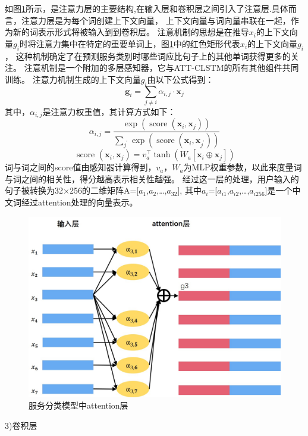   如图\ref{fig:att-cnn}所示，是注意力层的主要结构,在输入层和卷积层之间引入了注意层.具体而言，注意力层是为每个词创建上下文向量，
  上下文向量与词向量串联在一起，作为新的词表示形式将被输入到到卷积层。 
  注意机制的思想是在推导$x_{i}$的上下文向量$g_{i}$时将注意力集中在特定的重要单词上，图\ref{fig:att-cnn}中的红色矩形代表$x_{i}$的上下文向量$g_{i}$，
  这种机制确定了在预测服务类别时哪些词应比句子上的其他单词获得更多的关注。
  注意机制是一个附加的多层感知器，它与ATT-CLSTM的所有其他组件共同训练。
  注意力机制生成的上下文向量$g_{i}$由以下公式得到：
  \begin{equation}
  \mathbf{g}_{i}=\sum_{j \neq i} \alpha_{i, j} \cdot \mathbf{x}_{j}
\end{equation}
其中，$\alpha_{i, j}$是注意力权重值，其计算方式如下：
\begin{equation}
\alpha_{i, j}=\frac{\exp \left(\operatorname{score}\left(\mathbf{x}_{i}, \mathbf{x}_{j}\right)\right)}{\sum_{j^{\prime}} \exp \left(\operatorname{score}\left(\mathbf{x}_{i}, \mathbf{x}_{j^{\prime}}\right)\right)}
\end{equation}
\begin{equation}
\text { score }\left(\mathbf{x}_{i}, \mathbf{x}_{j}\right)=v_{a}^{\top} \tanh \left(W_{a}\left[\mathbf{x}_{i} \oplus \mathbf{x}_{j}\right]\right)
\end{equation}
词与词之间的score值由感知器计算得到，$v_{a}，W_{a}$为MLP权重参数，以此来度量词与词之间的相关性，得分越高表示相关性越强。
经过这一层的处理，用户输入的句子被转换为32×256的二维矩阵A=[$a_{1}$,$a_{2}$,\dots,$a_{32}$],
其中$a_{i}$=[$a_{i1}$,$a_{i2}$,\dots,$a_{i256}$]是一个中文词经过attention处理的向量表示。

\begin{figure}[htbp]
  \centering
  \includegraphics[scale=0.4]{./images/attcnn.jpg}
  \caption{服务分类模型中attention层}
  \label{fig:att-cnn}
\end{figure}
  3)卷积层

